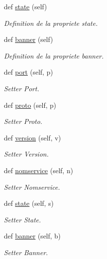 \begin{DoxyCompactItemize}
def \hyperlink{classscan__without__thread_1_1Service_aea2d2fc597f04c681ac670402969d018}{state} (self)
\begin{DoxyCompactList}\small\item\em Definition de la propriete state. \end{DoxyCompactList}\item 
def \hyperlink{classscan__without__thread_1_1Service_ac9b3870d554e7388468d23940c3e3c82}{banner} (self)
\begin{DoxyCompactList}\small\item\em Definition de la propriete banner. \end{DoxyCompactList}\item 
def \hyperlink{classscan__without__thread_1_1Service_a093db968d545662d0003af1047898470}{port} (self, p)
\begin{DoxyCompactList}\small\item\em Setter Port. \end{DoxyCompactList}\item 
def \hyperlink{classscan__without__thread_1_1Service_a73d2dc616fc4689a0d6bfe6e21be9d28}{proto} (self, p)
\begin{DoxyCompactList}\small\item\em Setter Proto. \end{DoxyCompactList}\item 
def \hyperlink{classscan__without__thread_1_1Service_ad363d91f916c412b94e3d8a06f09ffe0}{version} (self, v)
\begin{DoxyCompactList}\small\item\em Setter Version. \end{DoxyCompactList}\item 
def \hyperlink{classscan__without__thread_1_1Service_a08f7c443e3ca3d4004202eedbb1c6328}{nomservice} (self, n)
\begin{DoxyCompactList}\small\item\em Setter Nomservice. \end{DoxyCompactList}\item 
def \hyperlink{classscan__without__thread_1_1Service_aaebc50ca197d805732763f7af98ebedc}{state} (self, s)
\begin{DoxyCompactList}\small\item\em Setter State. \end{DoxyCompactList}\item 
def \hyperlink{classscan__without__thread_1_1Service_a06943e06602290a600477dd191c0af9c}{banner} (self, b)
\begin{DoxyCompactList}\small\item\em Setter Banner. \end{DoxyCompactList}\end{DoxyCompactItemize}


